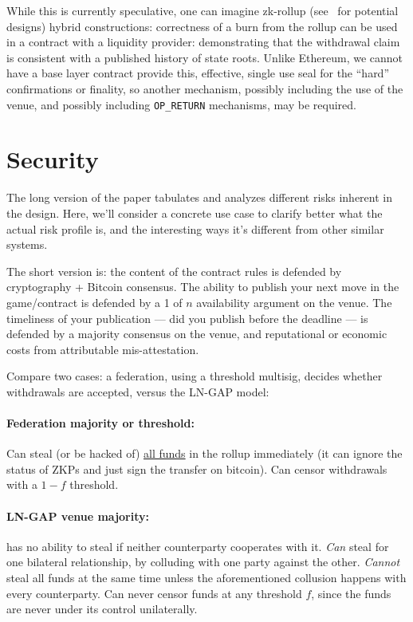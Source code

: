 \documentclass[11pt]{article}
\newcommand{\op}[1]{\texttt{OP\_#1}}
\begin{document}
While this is currently speculative, one can imagine zk-rollup (see~\cite{lightrollups} for potential designs)  hybrid constructions: correctness of a burn from the rollup can be used in a contract with a liquidity provider: demonstrating that the withdrawal claim is consistent with a published history of state roots. Unlike Ethereum, we cannot have a base layer contract provide this, effective, single use seal for the ``hard'' confirmations or finality, so another mechanism, possibly including the use of the venue, and possibly including \op{RETURN} mechanisms, may be required. 

\section{Security}
\label{sec:security}

The long version of the paper tabulates and analyzes different risks inherent in the design. Here, we'll consider a concrete use case to clarify better what the actual risk profile is, and the interesting ways it's different from other similar systems.

The short version is: the content of the contract rules is defended by cryptography + Bitcoin consensus. The ability to publish your next move in the game/contract is defended by a 1 of $n$ availability argument on the venue. The timeliness of your publication --- did you publish before the deadline --- is defended by a majority consensus on the venue, and reputational or economic costs from attributable mis-attestation.

Compare two cases: a federation, using a threshold multisig, decides whether withdrawals are accepted, versus the LN-GAP model:

\paragraph{Federation majority or threshold:} Can steal (or be hacked of) \underline{all funds} in the rollup immediately (it can ignore the status of ZKPs and just sign the transfer on bitcoin). Can censor withdrawals with a $1 - f$ threshold.
\paragraph{LN-GAP venue majority:} has no ability to steal if neither counterparty cooperates with it. \emph{Can} steal for one bilateral relationship, by colluding with one party against the other. \emph{Cannot} steal all funds at the same time unless the aforementioned collusion happens with every counterparty. Can never censor funds at any threshold $f$, since the funds are never under its control unilaterally.
\end{document}
